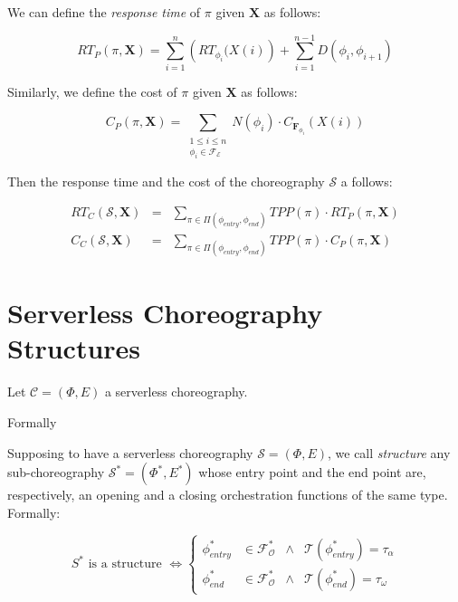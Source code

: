 \documentclass[12pt,a4paper]{report}
\theoremstyle{definition}
\begin{document}
We can define the \textit{response time} of $\pi$ given $\textbf{X}$ as follows:

\begin{equation}
	RT_P(\pi, \textbf{X}) = \sum_{i = 1}^n \left( RT_{\phi_i} (X(i) \right)  + \sum_{i = 1}^{n-1} D(\phi_i,\phi_{i+1})
\end{equation}

Similarly, we define the cost of $\pi$ given $\textbf{X}$ as follows:

\begin{equation}
	C_P(\pi, \textbf{X}) = \sum_{\substack{1\le i\le n\\ \phi_i \in \mathscr{F_E}}} N(\phi_i) \cdot C_{\textbf{F}_{\phi_i}} (X(i))
\end{equation}


Then the response time and the cost of the choreography $\mathcal{S}$ a follows:

\begin{eqnarray}
	RT_C(\mathcal{S}, \textbf{X}) & = & \sum_{\pi \in \Pi(\phi_{entry}, \phi_{end})} TPP(\pi) \cdot RT_{P}(\pi, \textbf{X}) \\
	C_C(\mathcal{S}, \textbf{X}) & = & \sum_{\pi \in \Pi(\phi_{entry}, \phi_{end})} TPP(\pi) \cdot C_{P}(\pi, \textbf{X}) 
\end{eqnarray}



\section{Serverless Choreography Structures}

Let $\mathcal{C} = (\Phi,E)$ a serverless choreography. 

Formally


Supposing to have a serverless choreography $\mathcal{S} = (\Phi,E)$, we call \textit{structure} any sub-choreography $\mathcal{S}^*= (\Phi^*,E^*)$ whose entry point and the end point are, respectively, an opening and a closing orchestration functions of the same type. Formally:

\begin{equation}
	S^* \text{ is a structure } \Leftrightarrow \left\{ \begin{array}{rlll}
		\phi_{entry}^* & \in \mathscr{F_O^*} & \wedge & \mathscr{T}(\phi_{entry}^*) = \tau_{\alpha} \\ 
		\phi_{end}^* & \in \mathscr{F_O^*} & \wedge & \mathscr{T}(\phi_{end}^*) = \tau_{\omega}
	\end{array} \right.
\end{equation}
\end{document}
